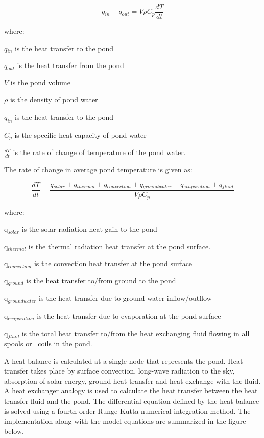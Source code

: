 \begin{equation}
q{}_{in} - q{}_{out} = V\rho C{}_p\frac{{dT}}{{dt}}
\end{equation}

where:

\(q{}_{in}\) is the heat transfer to the pond

\(q{}_{out}\) is the heat transfer from the pond

\(V\) is the pond volume

\(\rho\) is the density of pond water

\({q_{in}}\) is the heat transfer to the pond

\(C{}_p\) is the specific heat capacity of pond water

\(\frac{{dT}}{{dt}}\) is the  rate of change of temperature of the pond water.

The rate of change in average pond temperature is given as:

\begin{equation}
\frac{{dT}}{{dt}} = \frac{{q{}_{solar} + q{}_{thermal} + q{}_{convection} + q{}_{groundwater} + q{}_{evaporation} + q{}_{fluid}}}{{V\rho C{}_p}}
\end{equation}

where:

q\(_{solar}\) is the solar radiation heat gain to the pond

q\(_{thermal}\) is the thermal radiation heat transfer at the pond surface.

q\(_{convection}\) is the convection heat transfer at the pond surface

q\(_{ground}\) is the heat transfer to/from ground to the pond

q\(_{groundwater}\) is the heat transfer due to ground water inflow/outflow

q\(_{evaporation}\) is the heat transfer due to evaporation at the pond surface

q\(_{fluid}\) is the total heat transfer to/from the heat exchanging fluid flowing in all spools or~ coils in the pond.

A heat balance is calculated at a single node that represents the pond. Heat transfer takes place by surface convection, long-wave radiation to the sky, absorption of solar energy, ground heat transfer and heat exchange with the fluid. A heat exchanger analogy is used to calculate the heat transfer between the heat transfer fluid and the pond. The differential equation defined by the heat balance is solved using a fourth order Runge-Kutta numerical integration method. The implementation along with the model equations are summarized in the figure below.

